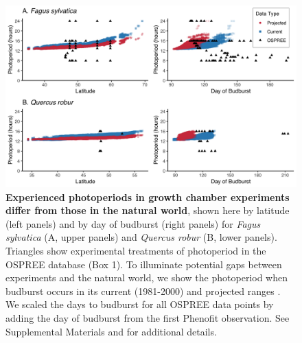 \documentclass{article}
\begin{document}
\begin{figure}[h]
\includegraphics{..//..//analyses/photoperiod/figures/2D_actual_combined.png} 
\caption{\textbf{Experienced photoperiods in growth chamber experiments differ from those in the natural world}, shown here by latitude (left panels) and by day of budburst (right panels) for \emph{Fagus sylvatica} (A, upper panels) and \emph{Quercus robur} (B, lower panels). Triangles show experimental treatments of photoperiod in the OSPREE database (Box 1). To illuminate potential gaps between experiments and the natural world, we show the photoperiod when budburst occurs in its current (1981-2000) and projected ranges \citep[2081-2100, using the A1Fi Phenofit scenario, see][]{duputie2015}. We scaled the days to budburst for all OSPREE data points by adding the day of budburst from the first Phenofit observation. See Supplemental Materials and \citet{duputie2015} for additional details.} 
 \label{fig:fagus}
 \end{figure}
 
 
\end{document}
